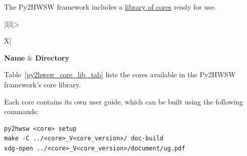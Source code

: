 %

The Py2HWSW framework includes a \href{https://github.com/IObundle/py2hwsw/tree/main/py2hwsw/lib}{library of cores} ready for use.

{
\setlength{\LTcapwidth}{\linewidth} %
\begin{xltabular}{\textwidth}{|l|l|>{\raggedright\arraybackslash}X|}
  \hline
  {\bf Name} & {\bf Directory}  \\ \hline \hline
  \endfirsthead
  \hline
  \caption{Cores available in the library of the Py2HWSW framework. The \textit{Directory} column is the path to the core's setup directory, relative to the Py2HWSW lib directory \texttt{py2hwsw/lib/}.}
  \endlastfoot

  

  \label{py2hwsw_core_lib_tab}
\end{xltabular}
}

Table~\ref{py2hwsw_core_lib_tab} lists the cores available in the Py2HWSW framework's core library.

Each core contains its own user guide, which can be built using the following commands:

\begin{lstlisting}
py2hwsw <core> setup
make -C ../<core>_V<core_version>/ doc-build
xdg-open ../<core>_V<core_version>/document/ug.pdf
\end{lstlisting}
